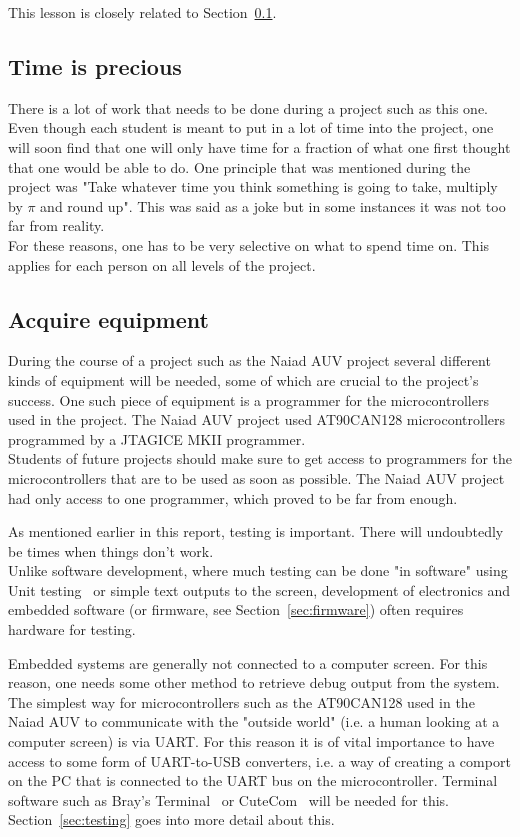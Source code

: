 This lesson is closely related to Section~\ref{sec:time}.

\subsection{Time is precious}\label{sec:time}
There is a lot of work that needs to be done during a project such as this one. Even though each student is meant to put in a lot of time into the project, one will soon find that one will only have time for a fraction of what one first thought that one would be able to do. One principle that was mentioned during the project was "Take whatever time you think something is going to take, multiply by $\pi$ and round up". This was said as a joke but in some instances it was not too far from reality. \\
For these reasons, one has to be very selective on what to spend time on. This applies for each person on all levels of the project.

\subsection{Acquire equipment}\label{sec:equipment}
During the course of a project such as the Naiad AUV project several different kinds of equipment will be needed, some of which are crucial to the project's success. One such piece of equipment is a programmer for the microcontrollers used in the project. The Naiad AUV project used AT90CAN128 microcontrollers programmed by a JTAGICE MKII programmer. \\
Students of future projects should make sure to get access to programmers for the microcontrollers that are to be used as soon as possible. The Naiad AUV project had only access to one programmer, which proved to be far from enough.

As mentioned earlier in this report, testing is important. There will undoubtedly be times when things don't work. \\
Unlike software development, where much testing can be done "in software" using Unit testing~\cite{web:wiki_unit_testing} or simple text outputs to the screen, development of electronics and embedded software (or firmware, see Section~\ref{sec:firmware}) often requires hardware for testing.

Embedded systems are generally not connected to a computer screen. For this reason, one needs some other method to retrieve debug output from the system. \\
The simplest way for microcontrollers such as the AT90CAN128 used in the Naiad AUV to communicate with the "outside world" (i.e. a human looking at a computer screen) is via UART. For this reason it is of vital importance to have access to some form of UART-to-USB converters, i.e. a way of creating a comport on the PC that is connected to the UART bus on the microcontroller. Terminal software such as Bray's Terminal~\cite{web:brays_terminal} or  CuteCom~\cite{web:cutecom_terminal} will be needed for this. \\
Section~\ref{sec:testing} goes into more detail about this.

